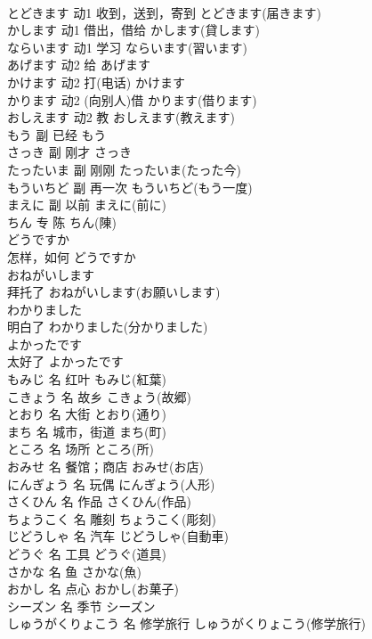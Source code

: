 \documentclass[8pt]{extreport}
\begin{document}
\begin{CJK}{UTF8}{min}
\\	とどきます	动1	收到，送到，寄到	とどきます(届きます)	
\\	かします	动1	借出，借给	かします(貸します)	
\\	ならいます	动1	学习	ならいます(習います)	
\\	あげます	动2	给	あげます	
\\	かけます	动2	打(电话)	かけます	
\\	かります	动2	(向别人)借	かります(借ります)	
\\	おしえます	动2	教	おしえます(教えます)	
\\	もう	副	已经	もう	
\\	さっき	副	刚才	さっき	
\\	たったいま	副	刚刚	たったいま(たった今)	
\\	もういちど	副	再一次	もういちど(もう一度)	
\\	まえに	副	以前	まえに(前に)	
\\	ちん	专	陈	ちん(陳)	
\\	どうですか	
\\	怎样，如何	どうですか	
\\	おねがいします	
\\	拜托了	おねがいします(お願いします)	
\\	わかりました	
\\	明白了	わかりました(分かりました)	
\\	よかったです	
\\	太好了	よかったです	
\\	もみじ	名	红叶	もみじ(紅葉)	
\\	こきょう	名	故乡	こきょう(故郷)	
\\	とおり	名	大街	とおり(通り)	
\\	まち	名	城市，街道	まち(町)	
\\	ところ	名	场所	ところ(所)	
\\	おみせ	名	餐馆；商店	おみせ(お店)	
\\	にんぎょう	名	玩偶	にんぎょう(人形)	
\\	さくひん	名	作品	さくひん(作品)	
\\	ちょうこく	名	雕刻	ちょうこく(彫刻)	
\\	じどうしゃ	名	汽车	じどうしゃ(自動車)	
\\	どうぐ	名	工具	どうぐ(道具)	
\\	さかな	名	鱼	さかな(魚)	
\\	おかし	名	点心	おかし(お菓子)	
\\	シーズン	名	季节	シーズン	
\\	しゅうがくりょこう	名	修学旅行	しゅうがくりょこう(修学旅行)	

\end{CJK}
\end{document}
